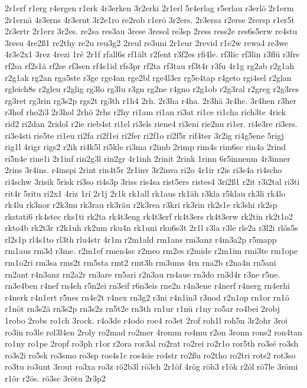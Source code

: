 {2r1erf
r1erg
r4ergen
r1erk
4r3erken
3r2erki
2r1erl
5r4erlag
r5erlau
r3erlö
2r1erm
2r1ernä
4r3erns
4r3ernt
3r2e1ro
re2rob
r1erö
3r2ers.
2r3ersa
r2erse
2rersp
r1er5t
2r3ertr
2r1erz
3r2es.
re2sa
res3au
3rese
3resol
re3sp
2ress
ress2e
res6s5erw
re4stu
3resu
4re2ß1
re2thy
re2u
reu3g2
2reul
re3uni
2r1eur
2revid
r1e2w
rewa4
re3we
4r3e2x1
3rez
4rezi
1ré
2r1f
rfall6s
rf1ält
r2fent
r3f2es
rfi4le.
rf3lic
rf3lin
r3flü
r3fre
rf2sa
rf2s1ä
rf2se
rf3sen
rf4s1id
rfs3pr
rf2ta
rf3tau
rf3t4r
r3fu
4r1g
rg2ab
r2g1ah
r2g1ak
rg2an
rga5ste
r3ge
rge4an
rge2bl
rge4l3er
rg5e4tap
r4geto
rgi4sel
r2glan
rgleich8s
r2gleu
r2glig
rg3lo
rg3lu
r3gn
rg2ne
r4gno
r2g1ob
r2g3ral
r2greg
r2g3res
rg3ret
rg3rin
rg3s2p
rgs2t
rg3th
r1h4
2rh.
2r3ha
r4ha.
2r3hä
3r4he.
3r4hen
r3her
r3hof
rho2i3
2r3hol
2rhö
2rhs
r2hy
ri1am
ri1an
ri3at
ri1ce
ri1cha
rich3te
4rick
rid2
ri2dan
2ridol
r2ie
rieb4st
ri1el
ri3els
riene4
ri3eni
rie2nu
ri1er.
ri4e3re
ri3ers.
ri3e4sti
rie5te
ri1eu
ri2fa
ri2f1ei
ri2fer
ri2f1o
ri2f5r
rif4ter
3r2ig
ri4g5ene
5rigj
rig1l
4rigr
rigs2
r2ik
ri4k5l
ri5kle
ri3ma
r2imb
2rimp
rim4s
rim6sc
rin4a
2rind
ri5n4e
rine1i
2r1inf
rin2g3l
rin2gr
4r1inh
2rinit
2rink
1rinn
6r5innenm
4r3inner
2rins
3r4ins.
r4inspi
2rint
rin4t5r
2r1inv
3r2inva
ri2o
4r1ir
r2is
ri3s4a
ri4scho
ri4schw
3risik
5risk
ri3so
ri4s3p
3riss
ris4sa
rist5ers
ristes4
3ri2ß1
r2it
r3i2tal
ri3ti
rit4r
5ritu
ri2x1
4riz
1rí
2r1j
2r1k
rk1all
rk1aus
rk1äh
r3kla
r5klau
rk3li
rk4lo
rk4lu
rk3nor
r2k3nu
rk3rau
rk3räu
r2k3rea
r3kri
rk3rin
rk2s1e
rk3shi
rk2sp
rkstati6
rk4stec
rks1ti
rk2ta
rk4t3eng
rk4t3erf
rk4t3ers
rk4t3erw
rk2tin
rk2t1o2
rkto4b
rk2t3r
r2k1uh
rk2um
rku4n
rk1uni
rku6s3t
2r1l
r3la
r3le
rle2a
r3l2i
rlös5s
rl2s1p
rl4s1to
rl3th
rlu4str
4r1m
r2m1ald
rm1ans
rm3anz
r4m3a2p
r5mapp
rm1aus
rm3d
r3me.
r2m1ef
rmen4sc
r2meo
rm2es
r2mide
r2m1im
rmi3te
rm1ope
rm1o2ri
rm3sa
rms2t
rm5sta
rmt2
rmt3h
rm3ums
4rn
rna2b
r2na4n
rn5ani
rn2ant
r4n3anz
rn2a2r
rn3are
rn5ari
r2n3au
rn4aue
rn3do
rn3d4r
r3ne
r5ne.
rn3e4ben
r4nef
rn4eh
r5n2ei
rn3eif
r6n3eis
rne2n
r4n3ene
r4nerf
r4nerg
rn4erhi
r4nerk
r4n1ert
r5nes
rn4e2t
r4nex
rn3g2
r3ni
r4n1in3
r3nod
r2n1op
rn1or
rn1ö
r1nöt
rn3s2ä
rn3s2p
rn3s2z
rn5t2e
rn3th
rn1ur
r1nü
r1ny
ro5ar
ro4bei
2robj
1robo
2robs
ro1ch
3rock.
r4o3de
r4odo
roe4
ro3et
2rof
roh1l
roh5n
3r2ohr
3roi
ro3in
ro3le
rol3l4en
2roly
ro2mad
ro2mer
4romm
ro4mu
r2on
3ronn
rons2
ron4tan
ro1ny
ro1pe
2ropf
ro3ph
r1or
r2ora
ror3al
ro2rat
ro2rei
ro2r1o
ror5th
ro3sé
ro3sh
ro3s2i
ro5sk
ro3smo
ro3sp
ros4s1c
ros4sie
ro4str
ro2ßu
ro2tho
ro2tri
rots2
rot3so
ro3tu
ro3unt
3rout
ro3xa
ro3z
rö2b3l
rö3ch
2r1öf
4rög
röh3
r1ök
r2öl
rö7le
3römi
r1ör
r2ös.
rö3sc
3rötu
2r3p2
}
